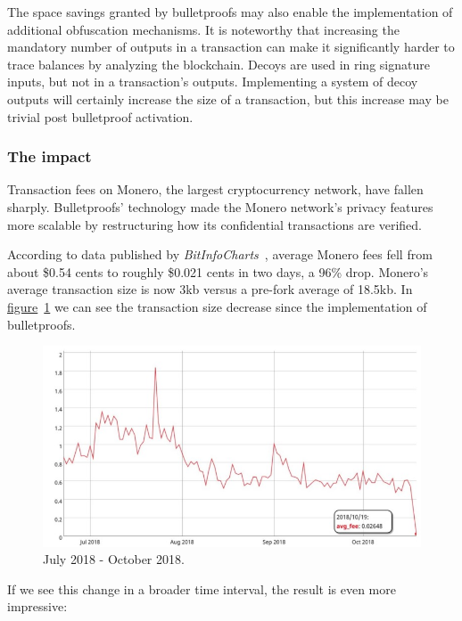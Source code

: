 The space savings granted by bulletproofs may also enable the implementation of additional obfuscation mechanisms. It is noteworthy that increasing the mandatory number of outputs in a transaction can make it significantly harder to trace balances by analyzing the blockchain. Decoys are used in ring signature inputs, but not in a transaction’s outputs. Implementing a system of decoy outputs will certainly increase the size of a transaction, but this increase may be trivial post bulletproof activation.

\subsubsection{The impact}
Transaction fees on Monero, the  largest cryptocurrency network, have fallen sharply. Bulletproofs' technology made the Monero network’s privacy features more scalable by restructuring how its confidential transactions are verified.

According to data published by \emph{BitInfoCharts}~\cite{bitinfocharts}, average Monero fees fell from about \$0.54 cents to roughly \$0.021 cents in two days, a 96\% drop. Monero’s average transaction size is now 3kb versus a pre-fork average of 18.5kb. In \hyperref[fig:bulletproof_2]{figure}~\ref{fig:bulletproof_2} we can see the transaction size decrease since the implementation of bulletproofs.

\begin{figure}[H]
  \centering
  \includegraphics[width=0.8 \columnwidth,keepaspectratio]{Images/Monero/bulletproofs_2.jpg}
  \caption{July 2018 - October 2018.~\cite{bitinfocharts}}
  \label{fig:bulletproof_2}
\end{figure}

If we see this change in a broader time interval, the result is even more impressive:

